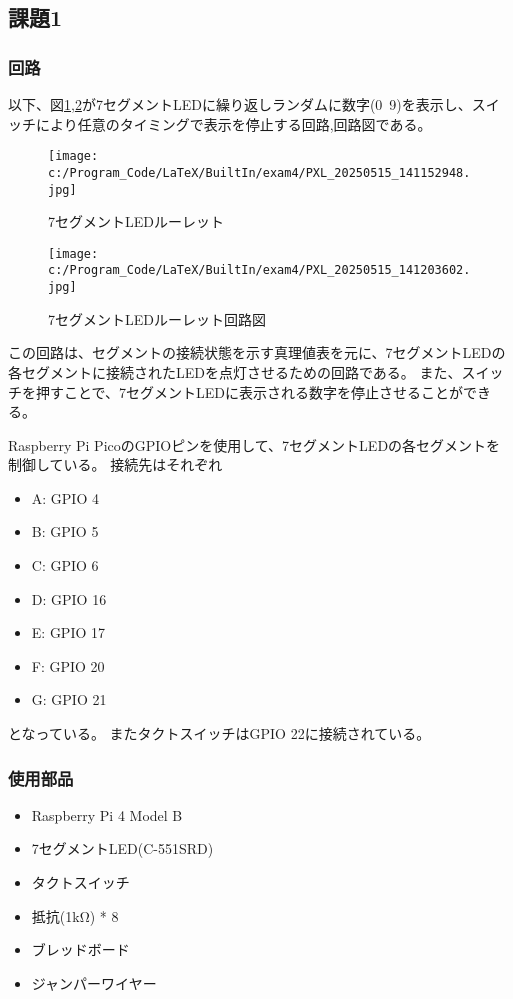 \documentclass[a4paper,11pt,dvipdfmx]{jsarticle}
\begin{document}
\subsection{課題1}

\subsubsection{回路}

以下、図\ref{exam4},\ref{kairozu}が7セグメントLEDに繰り返しランダムに数字(0~9)を表示し、スイッチにより任意のタイミングで表示を停止する回路,回路図である。
\begin{figure}[h]
\centering
\texttt{[image: c:/Program\_Code/LaTeX/BuiltIn/exam4/PXL\_20250515\_141152948.jpg]}
\caption{7セグメントLEDルーレット}
\label{exam4}
\end{figure}

\begin{figure}[h]
\centering
\texttt{[image: c:/Program\_Code/LaTeX/BuiltIn/exam4/PXL\_20250515\_141203602.jpg]}
\caption{7セグメントLEDルーレット回路図}
\label{kairozu}
\end{figure}

この回路は、セグメントの接続状態を示す真理値表を元に、7セグメントLEDの各セグメントに接続されたLEDを点灯させるための回路である。
また、スイッチを押すことで、7セグメントLEDに表示される数字を停止させることができる。

Raspberry Pi PicoのGPIOピンを使用して、7セグメントLEDの各セグメントを制御している。
接続先はそれぞれ
\begin{itemize}
    \item A: GPIO 4
    \item B: GPIO 5
    \item C: GPIO 6
    \item D: GPIO 16
    \item E: GPIO 17
    \item F: GPIO 20
    \item G: GPIO 21
    
\end{itemize}
となっている。
またタクトスイッチはGPIO 22に接続されている。

\subsubsection{使用部品}
\begin{itemize}
    \item Raspberry Pi 4 Model B
    \item 7セグメントLED(C-551SRD)
    \item タクトスイッチ
    \item 抵抗(1kΩ) * 8
    \item ブレッドボード
    \item ジャンパーワイヤー
\end{itemize}
\end{document}

